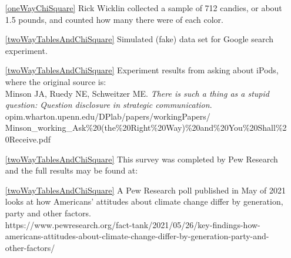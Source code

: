 \begin{itemize}
\item[\ref{oneWayChiSquare}]
    Rick Wicklin collected a sample of 712 candies, or about 1.5 pounds,
    and counted how many there were of each color.   \\

\item[\ref{twoWayTablesAndChiSquare}]
    Simulated (fake) data set for Google search experiment.

\item[\ref{twoWayTablesAndChiSquare}]
    Experiment results from asking about iPods, where the original source is:\\
    Minson JA, Ruedy NE, Schweitzer ME.
    \emph{There is such a thing as a stupid question:
    Question disclosure in strategic communication}. \\
    {\small{}
        {opim.wharton.upenn.edu/DPlab/papers/workingPapers/}}\\
    {\small{}
        {Minson\_working\_Ask\%20(the\%20Right\%20Way)\%20and\%20You\%20Shall\%20Receive.pdf}}

\item[\ref{twoWayTablesAndChiSquare}]
    This survey was completed by Pew Research and the full results
    may be found at:\\
    {\scriptsize{}}


\item[\ref{twoWayTablesAndChiSquare}]
    A Pew Research poll published in May of 2021 looks at how Americans’
    attitudes about climate change differ by generation, party and other factors.\\
      {\scriptsize{https://www.pewresearch.org/fact-tank/2021/05/26/key-findings-how-americans-attitudes-about-climate-change-differ-by-generation-party-and-other-factors/}}

\end{itemize}



